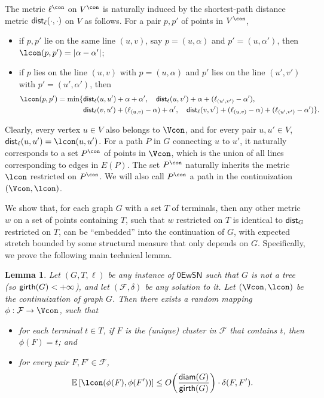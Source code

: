 \documentclass[11pt]{article}
\newtheorem{lemma}[theorem]{Lemma}
\theoremstyle{definition}
\newcommand{\fset}{{\mathcal{F}}}
\newcommand{\diam}{\textnormal{\textsf{diam}}}
\newcommand{\dist}{\textnormal{\textsf{dist}}}
\newcommand{\gir}{\textnormal{\textsf{girth}}}
\def\ex#1{{\mathbb{E}}\left[ #1 \right]}
\newcommand{\zesn}{\mathsf{0EwSN}}
\begin{document}
\begin{titlepage}
The metric $\ell^{\con}$ on $V^{\con}$ is naturally induced by the shortest-path distance metric $\dist_{\ell}(\cdot,\cdot)$ on $V$ as follows.
For a pair $p,p'$ of points in $V^{\con}$, 
\begin{itemize}
\item if $p,p'$ lie on the same line $(u,v)$, say $p=(u,\alpha)$ and $p'=(u,\alpha')$, then $\lcon(p,p')=|\alpha-\alpha'|$;
\item if $p$ lies on the line $(u,v)$ with $p=(u,\alpha)$ and $p'$ lies on the line $(u',v')$ with $p'=(u',\alpha')$, then 
\[
\begin{split}
\lcon(p,p')=\min\{
&  \dist_{\ell}(u,u')+\alpha+\alpha', \quad
	\dist_{\ell}(u,v')+\alpha+(\ell_{(u',v')}-\alpha'),\\
&	\dist_{\ell}(v,u')+(\ell_{(u,v)}-\alpha)+\alpha', \quad
	\dist_{\ell}(v,v')+(\ell_{(u,v)}-\alpha)+(\ell_{(u',v')}-\alpha')
\}.
\end{split}
\]
\end{itemize}
Clearly, every vertex $u\in V$ also belongs to $\Vcon$, and for every pair $u,u'\in V$, $\dist_{\ell}(u,u')=\lcon(u,u')$.
For a path $P$ in $G$ connecting $u$ to $u'$, it naturally corresponds to a set $P^{\con}$ of points in $\Vcon$, which is the union of all lines corresponding to edges in $E(P)$. The set $P^{\con}$ naturally inherits the metric $\lcon$ restricted on $P^{\con}$. We will also call $P^{\con}$ a path in the continuization $(\Vcon,\lcon)$.

We show that, for each graph $G$ with a set $T$ of terminals, then any other metric $w$ on a set of points containing $T$, such that $w$ restricted on $T$ is identical to $\dist_{G}$ restricted on $T$, can be ``embedded'' into the continuation of $G$, with expected stretch bounded by some structural measure that only depends on $G$. 
Specifically, we prove the following main technical lemma.


\begin{lemma} \label{lem:d-g}
Let $(G,T,\ell)$ be any instance of $\zesn$ such that $G$ is not a tree (so $\gir(G)<+\infty$), and let $(\fset,\delta)$ be any solution to it. Let $(\Vcon,\lcon)$ be the continuization of graph $G$.
Then there exists a random mapping $\phi: \fset \to \Vcon$, such that
\begin{itemize}
\item for each terminal $t\in T$, if $F$ is the (unique) cluster in $\fset$ that contains $t$, then $\phi(F)=t$; and
\item for every pair $F,F'\in \fset$,
$$\ex{\lcon(\phi(F),\phi(F'))} \le O\bigg(\frac{\diam(G)}{\gir(G)}\bigg)\cdot  \delta(F,F').$$
\end{itemize}
\end{lemma}


\end{titlepage}
\end{document}

